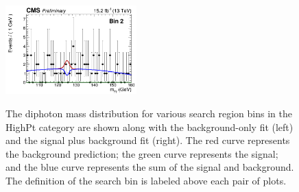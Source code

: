 \begin{figure}[ht!]
\includegraphics[width=0.45\textwidth, angle=0.]{figs/unblindedResults2p3Plus12p9/bin2_fit_s.png}\\
\caption{ The diphoton mass distribution for various search region bins in the HighPt category 
are shown along with the background-only fit (left) and the signal plus background fit (right). 
The red curve represents the background prediction; the green curve represents the signal; 
and the blue curve represents the sum of the signal and background. The definition of the search bin
is labeled above each pair of plots.
\label{fig:UnblindedResultsHighPt1}}
\end{figure}


